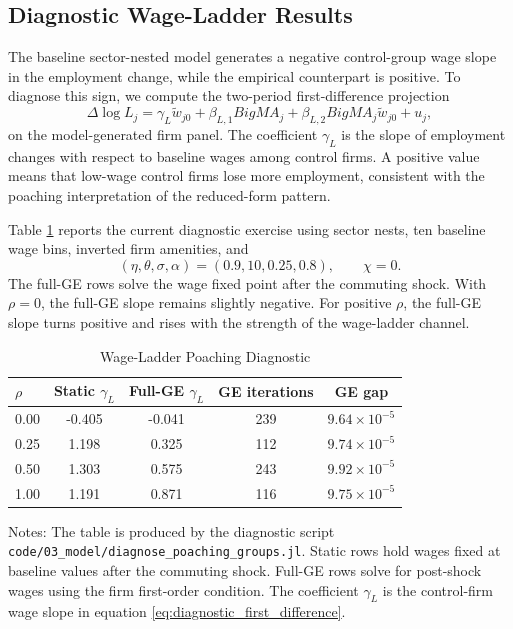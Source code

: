 \documentclass[12pt]{article}
\begin{document}
\subsection{Diagnostic Wage-Ladder Results}

The baseline sector-nested model generates a negative control-group wage slope in the employment change, while the empirical counterpart is positive. To diagnose this sign, we compute the two-period first-difference projection
\begin{equation}
    \Delta\log L_j
    =
    \gamma_L\widetilde{w}_{j0}
    +
    \beta_{L,1} BigMA_j
    +
    \beta_{L,2} BigMA_j\widetilde{w}_{j0}
    +
    u_j,
    \label{eq:diagnostic_first_difference}
\end{equation}
on the model-generated firm panel. The coefficient \(\gamma_L\) is the slope of employment changes with respect to baseline wages among control firms. A positive value means that low-wage control firms lose more employment, consistent with the poaching interpretation of the reduced-form pattern.

Table \ref{tab:poaching_ge_diagnostics} reports the current diagnostic exercise using sector nests, ten baseline wage bins, inverted firm amenities, and
\[
    (\eta,\theta,\sigma,\alpha)=(0.9,10,0.25,0.8),
    \qquad
    \chi=0.
\]
The full-GE rows solve the wage fixed point after the commuting shock. With \(\rho=0\), the full-GE slope remains slightly negative. For positive \(\rho\), the full-GE slope turns positive and rises with the strength of the wage-ladder channel.

\begin{table}[!htbp]\centering
\caption{Wage-Ladder Poaching Diagnostic}
\label{tab:poaching_ge_diagnostics}
\small
\begin{threeparttable}
\begin{tabular}{lcccc}
\toprule
\(\rho\) & Static \(\gamma_L\) & Full-GE \(\gamma_L\) & GE iterations & GE gap \\
\midrule
0.00 & -0.405 & -0.041 & 239 & \(9.64\times 10^{-5}\) \\
0.25 & 1.198 & 0.325 & 112 & \(9.74\times 10^{-5}\) \\
0.50 & 1.303 & 0.575 & 243 & \(9.92\times 10^{-5}\) \\
1.00 & 1.191 & 0.871 & 116 & \(9.75\times 10^{-5}\) \\
\bottomrule
\end{tabular}
\begin{tablenotes}[flushleft]
\footnotesize
\item Notes: The table is produced by the diagnostic script \texttt{code/03\_model/diagnose\_poaching\_groups.jl}. Static rows hold wages fixed at baseline values after the commuting shock. Full-GE rows solve for post-shock wages using the firm first-order condition. The coefficient \(\gamma_L\) is the control-firm wage slope in equation \eqref{eq:diagnostic_first_difference}.
\end{tablenotes}
\end{threeparttable}
\end{table}
\end{document}
